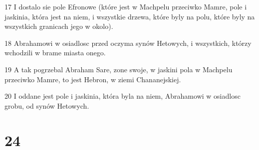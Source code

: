 \par 17 I dostalo sie pole Efronowe (które jest w Machpelu przeciwko Mamre, pole i jaskinia, która jest na niem, i wszystkie drzewa, które byly na polu, które byly na wszystkich granicach jego w okolo).
\par 18 Abrahamowi w osiadlosc przed oczyma synów Hetowych, i wszystkich, którzy wchodzili w brame miasta onego.
\par 19 A tak pogrzebal Abraham Sare, zone swoje, w jaskini pola w Machpelu przeciwko Mamre, to jest Hebron, w ziemi Chananejskiej.
\par 20 I oddane jest pole i jaskinia, która byla na niem, Abrahamowi w osiadlosc grobu, od synów Hetowych.

\chapter{24}

